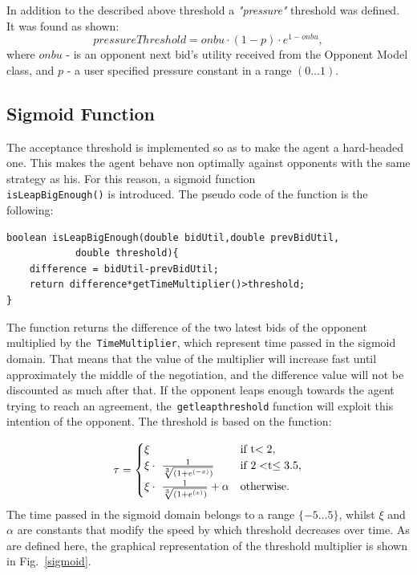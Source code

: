 \documentclass[html]{report}    %
\begin{document}
In addition to the described above threshold a \textit{"pressure"} threshold was defined. It was found as shown:
\begin{dmath} \label{7}	
	pressureThreshold = onbu\cdot(1 - p)\cdot e^{1 - onbu},
\end{dmath}
where $onbu$ - is an opponent next bid's utility received from the Opponent Model class, and $p$ - a user specified pressure constant in a range $(0\dots1)$.

\subsection{Sigmoid Function}
The acceptance threshold is implemented so as to make the agent a hard-headed one. This makes the agent behave non optimally against opponents with the same strategy as his. For this reason, a sigmoid function\\
\texttt{isLeapBigEnough()} is introduced. The pseudo code of the function is the following:
\begin{verbatim}
boolean isLeapBigEnough(double bidUtil,double prevBidUtil,
            double threshold){
    difference = bidUtil-prevBidUtil;
    return difference*getTimeMultiplier()>threshold;
}
\end{verbatim}

The function returns the difference of the two latest bids of the opponent multiplied by the~\texttt{TimeMultiplier}, which represent time passed in the sigmoid domain. That means that the value of the multiplier will increase fast until approximately the middle of the negotiation, and the difference value will not be discounted as much after that. If the opponent leaps enough towards the agent trying to reach an agreement, the~\texttt{getleapthreshold} function will exploit this intention of the opponent. The threshold is based on the function: 

\begin{equation} \label{10}
	\tau =	\begin{cases}
	    	\xi & \mbox{if } $t$ < 2, \\
	   		\xi\cdot~\frac{1}{\sqrt[3]{(1+e^{(-x)})}} & \mbox{if }  2 < $t$ \leq 3.5,\\
    	   	\xi\cdot~\frac{1}{\sqrt[3]{(1+e^{(x)})}}+ \alpha & \mbox{otherwise.}
			\end{cases}
\end{equation}
The time passed in the sigmoid domain belongs to a range \textbf{$\{-5\dots5\}$}, whilst $\xi$ and $\alpha$ are constants that modify the speed by which threshold decreases over time. As are defined here, the graphical representation of the threshold multiplier is shown in Fig.~\ref{sigmoid}.
\end{document}
